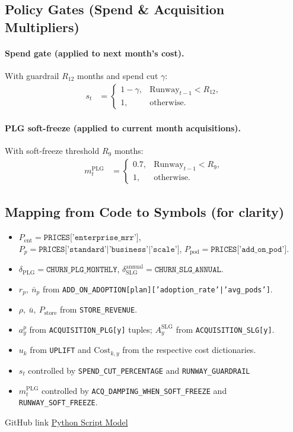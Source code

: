 \documentclass[11pt, a4paper, oneside]{article}
\begin{document}
\subsection{Policy Gates (Spend \& Acquisition Multipliers)}
\paragraph{Spend gate (applied to next month’s cost).}
With guardrail $R_{12}$ months and spend cut $\gamma$:
\begin{align}
s_t 
  &= 
  \begin{cases}
    1-\gamma, & \mathrm{Runway}_{t-1} < R_{12},\\
    1, & \text{otherwise.}
  \end{cases}
\end{align}

\paragraph{PLG soft-freeze (applied to current month acquisitions).}
With soft-freeze threshold $R_{9}$ months:
\begin{align}
m^{\mathrm{PLG}}_t 
  &= 
  \begin{cases}
    0.7, & \mathrm{Runway}_{t-1} < R_{9},\\
    1, & \text{otherwise.}
  \end{cases}
\end{align}

\subsection{Mapping from Code to Symbols (for clarity)}
\begin{itemize}
  \item $P_{\mathrm{ent}} = \texttt{PRICES['enterprise\_mrr']}$, $P_p=\texttt{PRICES['standard'|'business'|'scale']}$, $P_{\mathrm{pod}}=\texttt{PRICES['add\_on\_pod']}$.
  \item $\delta_{\mathrm{PLG}}=\texttt{CHURN\_PLG\_MONTHLY}$, $\delta^{\mathrm{annual}}_{\mathrm{SLG}}=\texttt{CHURN\_SLG\_ANNUAL}$.
  \item $r_p,\ \bar{n}_p$ from \texttt{ADD\_ON\_ADOPTION[plan]['adoption\_rate'|'avg\_pods']}.
  \item $\rho,\ \bar{u},\ P_{\mathrm{store}}$ from \texttt{STORE\_REVENUE}.
  \item $a^p_y$ from \texttt{ACQUISITION\_PLG[y]} tuples; $A^{\mathrm{SLG}}_y$ from \texttt{ACQUISITION\_SLG[y]}.
  \item $u_k$ from \texttt{UPLIFT} and $\mathrm{Cost}_{k,y}$ from the respective cost dictionaries.
  \item $s_t$ controlled by \texttt{SPEND\_CUT\_PERCENTAGE} and \texttt{RUNWAY\_GUARDRAIL}
  \item $m^{\mathrm{PLG}}_t$ controlled by \texttt{ACQ\_DAMPING\_WHEN\_SOFT\_FREEZE} and \texttt{RUNWAY\_SOFT\_FREEZE}.
\end{itemize}
GitHub link \href{https://github.com/kuduk/intellyhub-businessplan/blob/main/breakeven.v2.02.py}{Python Script Model}
\end{document}
